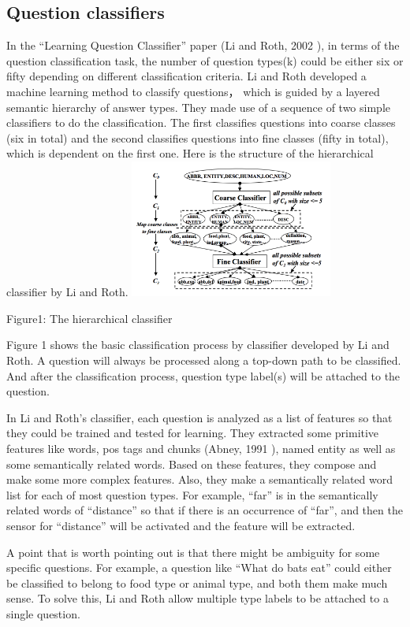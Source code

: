 \documentclass[10pt,twocolumn,letterpaper]{article}
\begin{document}
\subsection{Question classifiers}
In the ``Learning Question Classifier'' paper (Li and Roth, 2002 \cite{li2002learning}), in terms of the question classification task, the number of question types(k) could be either six or fifty depending on different classification criteria.  Li and Roth developed a machine learning method to classify questions， which is guided by a layered semantic hierarchy of answer types. They made use of a sequence of two simple classifiers to do the classification. The first classifies questions into coarse classes (six in total) and the second classifies questions into fine classes (fifty in total), which is dependent on the first one. Here is the structure of the hierarchical classifier by Li and Roth.
\includegraphics[width=0.5\textwidth]{structure.png}
\begin{center}
Figure1:  The hierarchical classifier 
\end{center}
Figure 1 shows the basic classification process by classifier developed by Li and Roth. A question will always be processed along a top-down path to be classified. And after the classification process, question type label(s) will be attached to the question.

In Li and Roth's classifier, each question is analyzed as a list of features so that they could be trained and tested for learning. They extracted some primitive features like words, pos tags and chunks (Abney, 1991 \cite{berwick1991principle}), named entity as well as some semantically related words. Based on these features, they compose and make some more complex features. Also, they make a semantically related word list for each of most question types. For example, ``far'' is in the semantically related words of ``distance'' so that if there is an occurrence of ``far'', and then the sensor for ``distance'' will be activated and the feature will be extracted.

A point that is worth pointing out is that there might be ambiguity for some specific questions. For example, a question like ``What do bats eat'' could either be classified to belong to food type or animal type, and both them make much sense. To solve this, Li and Roth allow multiple type labels to be attached to a single question.
\end{document}
